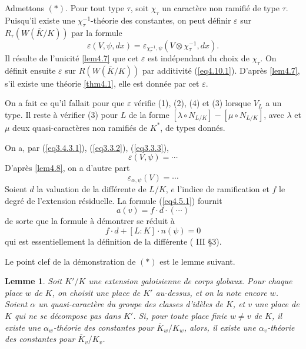 \documentclass[11pt,a4paper]{amsart}
\theoremstyle{plain}
\newtheorem{lemma}[theorem]{Lemme}
\theoremstyle{definition}
\newenvironment{para}{\par\noindent}{\par}
\newcommand{\ov}[1]{\overline{#1}}
\newcommand{\eps}{\varepsilon}
\begin{document}
\begin{para}
Admettons $(*)$. Pour tout type $\tau$, soit $\chi_{\tau}$ un caract\`ere non ramifi\'e de type $\tau$. Puisqu'il existe une $\chi_{\tau}^{-1}$-th\'eorie des constantes, on peut d\'efinir $\eps$ sur $R_{\tau}(W(\ov{K}/K))$ par la formule
\[
\eps(V,\psi,dx) = \eps_{\chi_{\tau}^{-1},\psi}(V \otimes \chi_{\tau}^{-1}, dx).
\]
Il r\'esulte de l'unicit\'e \ref{lem4.7} que cet $\eps$ est ind\'ependant du choix de $\chi_{\tau}$. On d\'efinit ensuite $\eps$ sur $R(W(\ov{K}/K))$ par additivit\'e (\ref{eq4.10.1}). D'apr\`es \ref{lem4.7}, s'il existe une th\'eorie \ref{thm4.1}, elle est donn\'ee par cet $\eps$.
\end{para}

\begin{para}
On a fait ce qu'il fallait pour que $\eps$ v\'erifie (1), (2), (4) et (3) lorsque $V_{L}$ a un type. Il reste \`a v\'erifier (3) pour $L$ de la forme $[\lambda \circ N_{L/K}] - [\mu \circ N_{L/K}]$, avec $\lambda$ et $\mu$ deux quasi-caract\`eres non ramifi\'es de $K^{*}$, de types donn\'es.

On a, par (\ref{eq3.4.3.1}), (\ref{eq3.3.2}), (\ref{eq3.3.3}),
\[
\eps(V,\psi) = \cdots
\]
D'apr\`es \ref{lem4.8}, on a d'autre part
\[
\eps_{\alpha,\psi}(V) = \cdots
\]
Soient $d$ la valuation de la diff\'erente de $L/K$, $e$ l'indice de ramification et $f$ le degr\'e de l'extension r\'esiduelle. La formule (\ref{eq4.5.1}) fournit
\[
a(v) = f \cdot d \cdot (\cdots)
\]
de sorte que la formule \`a d\'emontrer se r\'eduit \`a
\[
f \cdot d + [L:K] \cdot n(\psi) = 0
\]
qui est essentiellement la d\'efinition de la diff\'erente (\cite{10} III \S3).

Le point clef de la d\'emonstration de $(*)$ est le lemme suivant.
\end{para}

\begin{lemma}\label{lem4.12}
Soit $K'/K$ une extension galoisienne de corps globaux. Pour chaque place $w$ de $K$, on choisit une place de $K'$ au-dessus, et on la note encore $w$. Soient $\alpha$ un quasi-caract\`ere du groupe des classes d'id\`eles de $K$, et $v$ une place de $K$ qui ne se d\'ecompose pas dans $K'$. Si, pour toute place finie $w \not= v$ de $K$, il existe une $\alpha_{w}$-th\'eorie des constantes pour $\ov{K}_{w}/K_{w}$, alors, il existe une $\alpha_{v}$-th\'eorie des constantes pour $\ov{K}_{v}/K_{v}$.
\end{lemma}
\end{document}
